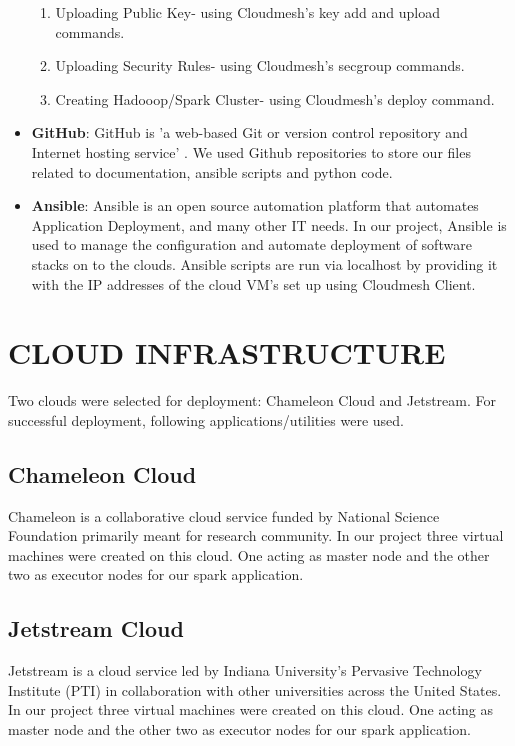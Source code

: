 \documentclass[9pt,twocolumn,twoside]{../../styles/osajnl}
\begin{document}
\begin{itemize}
	\begin{enumerate}
		\item {Uploading Public Key-} using Cloudmesh's key add and upload commands.
		\item {Uploading Security Rules-} using Cloudmesh's secgroup commands.  
		\item {Creating Hadooop/Spark Cluster-} using Cloudmesh's deploy command. 
	\end{enumerate}
	
	\item \textbf{GitHub}: GitHub is 'a web-based Git or version control repository and Internet hosting service' \cite{www-github}. We used Github repositories to store our files related to documentation, ansible scripts and python code.
	
	\item \textbf{Ansible}: Ansible is an open source automation platform that automates Application Deployment, and many other IT needs. In our project, Ansible is used to manage the configuration and automate deployment of software stacks on to the clouds. Ansible scripts are run via localhost by providing it with the IP addresses of the cloud VM's set up using Cloudmesh Client.
	
\end{itemize}				


\section{CLOUD INFRASTRUCTURE}
	Two clouds were selected for deployment: Chameleon Cloud and Jetstream. For successful deployment, following applications/utilities were used.
	\subsection{Chameleon Cloud}
		Chameleon  is a collaborative cloud service funded by National Science Foundation primarily meant for research community. In our project three virtual machines were created on this cloud. One acting as master node and the other two as executor nodes for our spark application.
	
	\subsection{Jetstream Cloud}
		Jetstream is a cloud service led by Indiana University’s Pervasive Technology Institute (PTI) in collaboration with other universities \cite{www-jetstream} across the United States. In our project three virtual machines were created on this cloud. One acting as master node and the other two as executor nodes for our spark application.
		
\end{document}
